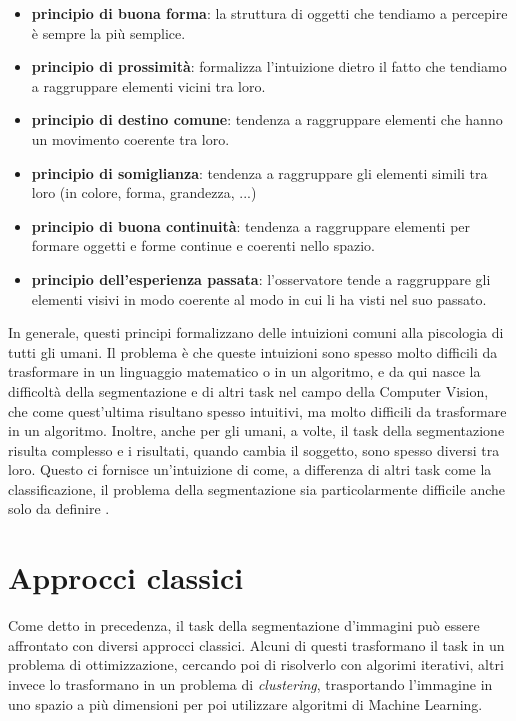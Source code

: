 \begin{itemize}
    \item \textbf{principio di buona forma}: la struttura di oggetti che tendiamo a percepire è sempre la più semplice.

    \item \textbf{principio di prossimità}: formalizza l'intuizione dietro il fatto che tendiamo a raggruppare elementi vicini tra loro.
    
    \item \textbf{principio di destino comune}: tendenza a raggruppare elementi che hanno un movimento coerente tra loro.
    
    \item \textbf{principio di somiglianza}: tendenza a raggruppare gli elementi simili tra loro (in colore, forma, grandezza, ...)
    
    \item \textbf{principio di buona continuità}: tendenza a raggruppare elementi per formare oggetti e forme continue e coerenti nello spazio.
    
    \item \textbf{principio dell'esperienza passata}: l'osservatore tende a raggruppare gli elementi visivi in modo coerente al modo in cui li ha visti nel suo passato.
\end{itemize}

In generale, questi principi formalizzano delle intuizioni comuni alla piscologia di tutti gli umani. Il problema è che queste intuizioni sono spesso molto difficili da trasformare in un linguaggio matematico o in un algoritmo, e da qui nasce la difficoltà della segmentazione e di altri task nel campo della Computer Vision, che come quest'ultima risultano spesso intuitivi, ma molto difficili da trasformare in un algoritmo.
Inoltre, anche per gli umani, a volte, il task della segmentazione risulta complesso e i risultati, quando cambia il soggetto, sono spesso diversi tra loro.  Questo ci fornisce un'intuizione di come, a differenza di altri task come la classificazione, il problema della segmentazione sia particolarmente difficile anche solo da definire \cite{martin2001database}.







\section{Approcci classici}
Come detto in precedenza, il task della segmentazione d'immagini può essere affrontato con diversi approcci classici. Alcuni di questi trasformano il task in un problema di ottimizzazione, cercando poi di risolverlo con algorimi iterativi,  altri invece lo trasformano in un problema di \textit{clustering}, trasportando l'immagine in uno spazio a più dimensioni per poi utilizzare algoritmi di Machine Learning. 







